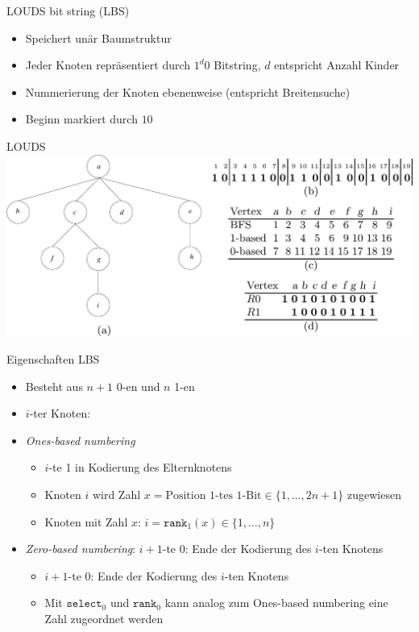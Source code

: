 \documentclass[ngerman,aspectratio=169,10pt]{beamer}
\begin{document}
\begin{frame}{LOUDS bit string (LBS)}
    \begin{itemize}
        \item Speichert unär Baumstruktur
        \item Jeder Knoten repräsentiert durch $1^d0$ Bitstring, $d$ entspricht Anzahl Kinder
        \item Nummerierung der Knoten ebenenweise (entspricht Breitensuche)
        \item Beginn markiert durch $10$
    \end{itemize}
\end{frame}

\begin{frame}{LOUDS}
    \includegraphics[width=1.0\textwidth]{LOUDS.jpg}
\end{frame}

\begin{frame}{Eigenschaften LBS}
    \begin{itemize}
        \item Besteht aus $n+1$ 0-en und $n$ 1-en
        \item $i$-ter Knoten:
        \item \textit{Ones-based numbering}
        \begin{itemize}
            \item $i$-te 1 in Kodierung des Elternknotens
            \item Knoten $i$ wird Zahl $x=\text{Position 1-tes 1-Bit}\in\{1,\ldots,2n+1\}$ zugewiesen
            \item Knoten mit Zahl $x$: $i=\texttt{rank}_1(x)\in\{1,\ldots,n\}$
        \end{itemize}
        \item \textit{Zero-based numbering}: $i+1$-te 0: Ende der Kodierung des $i$-ten Knotens
        \begin{itemize}
            \item $i+1$-te 0: Ende der Kodierung des $i$-ten Knotens
            \item Mit $\texttt{select}_0$ und $\texttt{rank}_0$ kann analog zum Ones-based numbering eine Zahl zugeordnet werden
        \end{itemize}
    \end{itemize}
\end{frame}
\end{document}
